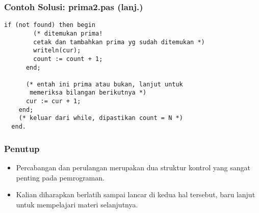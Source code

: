 \begin{frame}[fragile]
\frametitle{Contoh Solusi: prima2.pas (lanj.)}
\begin{lstlisting}[gobble=2]
      if (not found) then begin
        (* ditemukan prima!
        cetak dan tambahkan prima yg sudah ditemukan *)
        writeln(cur);
        count := count + 1;
      end;

      (* entah ini prima atau bukan, lanjut untuk
       memeriksa bilangan berikutnya *)
      cur := cur + 1;
    end;
    (* keluar dari while, dipastikan count = N *)
  end.
\end{lstlisting}
\end{frame}

\begin{frame}
\frametitle{Penutup}
\begin{itemize}
  \item Percabangan dan perulangan merupakan dua struktur kontrol yang sangat penting pada pemrograman.
  \item Kalian diharapkan berlatih sampai lancar di kedua hal tersebut, baru lanjut untuk mempelajari materi selanjutnya.
\end{itemize}
\end{frame}


